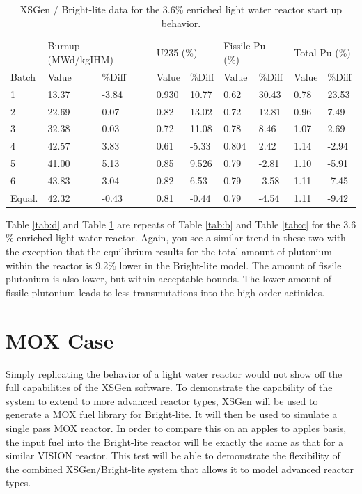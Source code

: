 \documentclass{article}
\begin{document}
\begin{table}[!htb]
\centering
\caption{XSGen / Bright-lite data for the 3.6\% enriched light water reactor start up behavior.}
\label{tab:e}
\begin{tabular}{lllllllll}
 & \multicolumn{2}{l}{Burnup (MWd/kgIHM)} & \multicolumn{2}{l}{U235 (\%)} & \multicolumn{2}{l}{Fissile Pu (\%)} & \multicolumn{2}{l}{Total Pu (\%)} \\
Batch & Value & \%Diff & Value & \%Diff & Value & \%Diff & Value & \%Diff \\
1 & 13.37 & -3.84 & 0.930 & 10.77 & 0.62 & 30.43 & 0.78 & 23.53 \\
2 & 22.69 & 0.07 & 0.82 & 13.02 & 0.72 & 12.81 & 0.96 & 7.49 \\
3 & 32.38 & 0.03 & 0.72 & 11.08 & 0.78 & 8.46 & 1.07 & 2.69 \\
4 & 42.57 & 3.83 & 0.61 & -5.33 & 0.804 & 2.42 & 1.14 & -2.94 \\
5 & 41.00 & 5.13 & 0.85 & 9.526 & 0.79 & -2.81 & 1.10 & -5.91 \\
6 & 43.83 & 3.04 & 0.82 & 6.53 & 0.79 & -3.58 & 1.11 & -7.45 \\
Equal. & 42.32 & -0.43 & 0.81 & -0.44 & 0.79 & -4.54 & 1.11 & -9.42
\end{tabular}
\end{table}

Table \ref{tab:d} and Table \ref{tab:e} are repeats of Table \ref{tab:b} and Table \ref{tab:c} for the 3.6$\%$ enriched light water reactor. Again, you see a similar trend in these two with the exception that the equilibrium results for the total amount of plutonium within the reactor is 9.2$\%$ lower in the Bright-lite model. The amount of fissile plutonium is also lower, but within acceptable bounds. The lower amount of fissile plutonium leads to less transmutations into the high order actinides.

\section{MOX Case}
Simply replicating the behavior of a light water reactor would not show off the full capabilities of the XSGen software. To demonstrate the capability of the system to extend to more advanced reactor types, XSGen will be used to generate a MOX fuel library for Bright-lite. It will then be used to simulate a single pass MOX reactor. In order to compare this on an apples to apples basis, the input fuel into the Bright-lite reactor will be exactly the same as that for a similar VISION reactor. This test will be able to demonstrate the flexibility of the combined XSGen/Bright-lite system that allows it to model advanced reactor types.
\end{document}
